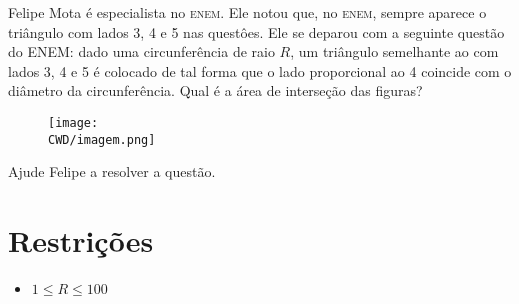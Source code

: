 %

Felipe Mota é especialista no \textsc{enem}. Ele notou que, no \textsc{enem}, sempre aparece o triângulo com lados 3, 4 e 5 nas questôes. Ele se deparou com a seguinte questão do ENEM: dado uma circunferência de raio $R$, um triângulo semelhante ao com lados 3, 4 e 5 é colocado de tal forma que o lado proporcional ao 4 coincide com o diâmetro da circunferência. Qual é a área de interseção das figuras?

\begin{figure}[H]
  \centering
  \texttt{[image: \\CWD/imagem.png]}
\end{figure}

Ajude Felipe a resolver a questão.

%
%

%
%


\section*{Restrições}

\begin{itemize}
\item $ 1 \leq R \leq 100$\end{itemize}


\sampleio
